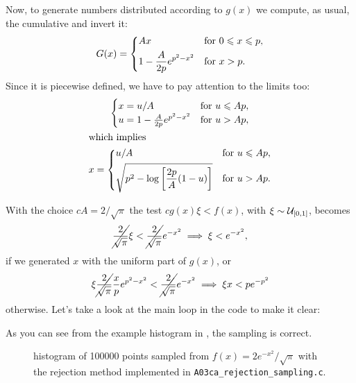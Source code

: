 Now, to generate numbers distributed according to $g(x)$ we compute, as usual,
the cumulative and invert it: 
\begin{equation}
    G(x) =
    \begin{dcases}
        Ax & \text{for } 0 \leq x \leq p, \\
        1 - \frac{A}{2p} e^{p^{2} - x^{2}} & \text{for } x > p.
    \end{dcases}
\end{equation}
Since it is piecewise defined, we have to pay attention to the limits too:
\begin{gather}
    \begin{cases}
        x = u / A & \text{for } u \leq Ap, \\
        u = 1 - \frac{A}{2p} e^{p^{2} - x^{2}} & \text{for } u > Ap,
    \end{cases} \\
\shortintertext{which implies}
    x = 
    \begin{dcases}
        u / A & \text{for } u \leq Ap, \\
        \sqrt{p^{2} - \log\left[\frac{2p}{A}(1 - u)\right]} & \text{for } u > Ap.
    \end{dcases}
\end{gather}

With the choice $cA = 2 / \sqrt{\pi}$ the test $c g(x) \xi < f(x)$, with $\xi
\sim \unif{0}{1}$, becomes
\begin{equation}
    \cancel{\frac{2}{\sqrt{\pi}}} \xi < \cancel{\frac{2}{\sqrt{\pi}}}
    e^{-x^{2}} \implies \xi < e^{-x^{2}},
\end{equation}
if we generated $x$ with the uniform part of $g(x)$, or
\begin{equation}
    \xi \cancel{\frac{2}{\sqrt{\pi}}} \frac{x}{p}e^{p^{2} - x^{2}} <
    \cancel{\frac{2}{\sqrt{\pi}}} e^{-x^{2}} \implies \xi x < p e^{-p^{2}}
\end{equation}
otherwise. Let’s take a look at the main loop in the code to make it clear:

As you can see from the example histogram in , the sampling is
correct.

\begin{figure}
    \centering
    
    \caption{histogram of \num{100000} points sampled from $f(x) = 2 e^{-x^{2}}
        / \sqrt{\pi}$ with the rejection method implemented in
        \texttt{A03ca\_rejection\_sampling.c}.}
    \label{fig:A03ca}
\end{figure}


